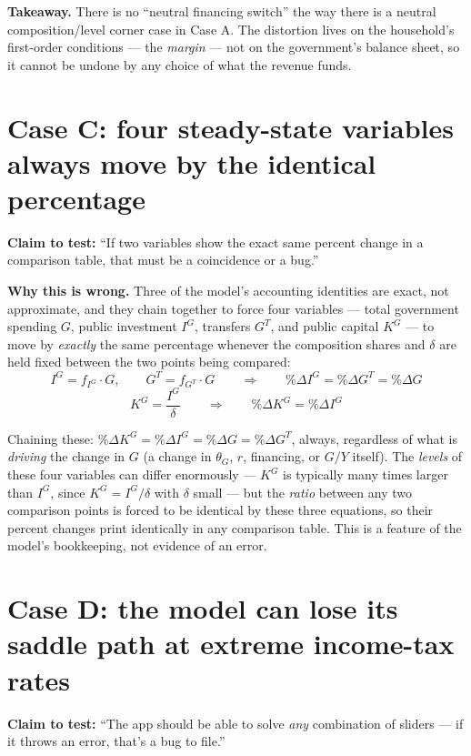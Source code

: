 \documentclass[11pt]{article}
\newcommand{\eq}[1]{\begin{equation}#1\end{equation}}
\begin{document}
\begin{notebox}
\textbf{Takeaway.} There is no ``neutral financing switch'' the way there
is a neutral composition/level corner case in Case A. The distortion lives
on the household's first-order conditions --- the \emph{margin} --- not on
the government's balance sheet, so it cannot be undone by any choice of
what the revenue funds.
\end{notebox}

\section{Case C: four steady-state variables always move by the identical percentage}
\label{sec:caseC}

\textbf{Claim to test:} ``If two variables show the exact same percent
change in a comparison table, that must be a coincidence or a bug.''

\textbf{Why this is wrong.} Three of the model's accounting identities are
exact, not approximate, and they chain together to force four variables ---
total government spending $G$, public investment $I^G$, transfers $G^T$,
and public capital $K^G$ --- to move by \emph{exactly} the same percentage
whenever the composition shares and $\delta$ are held fixed between the two
points being compared:
\eq{ I^G = f_{I^G}\cdot G, \qquad G^T = f_{G^T}\cdot G \qquad \Longrightarrow \qquad \%\Delta I^G = \%\Delta G^T = \%\Delta G }
\eq{ K^G = \frac{I^G}{\delta} \qquad \Longrightarrow \qquad \%\Delta K^G = \%\Delta I^G }

Chaining these: $\%\Delta K^G=\%\Delta I^G=\%\Delta G=\%\Delta G^T$, always,
regardless of what is \emph{driving} the change in $G$ (a change in $\theta_G$,
$r$, financing, or $G/Y$ itself). The \emph{levels} of these four variables
can differ enormously --- $K^G$ is typically many times larger than $I^G$,
since $K^G=I^G/\delta$ with $\delta$ small --- but the \emph{ratio} between
any two comparison points is forced to be identical by these three
equations, so their percent changes print identically in any comparison
table. This is a feature of the model's bookkeeping, not evidence of an
error.

\section{Case D: the model can lose its saddle path at extreme income-tax rates}
\label{sec:caseD}

\textbf{Claim to test:} ``The app should be able to solve \emph{any}
combination of sliders --- if it throws an error, that's a bug to file.''
\end{document}
